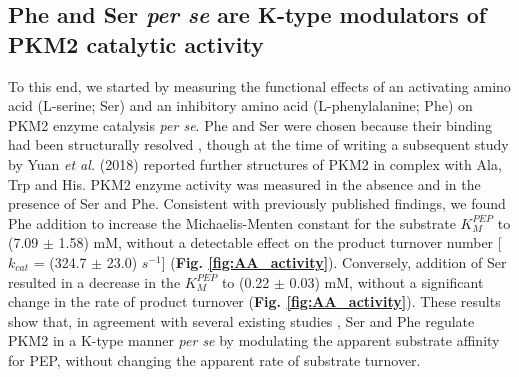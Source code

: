 \subsection{Phe and Ser \textit{per se} are K-type modulators of PKM2 catalytic activity}
\label{subsec:phe_ser_fbp_activity}
To this end, we started by measuring the functional effects of an activating amino acid (L-serine; Ser) and an inhibitory amino acid (L-phenylalanine; Phe) on PKM2 enzyme catalysis \textit{per se}. Phe and Ser were chosen because their binding had been structurally resolved \cite{Chaneton:2012aa,Morgan:2013aa}, though at the time of writing a subsequent study by Yuan \textit{et al.} (2018) \cite{Yuan:2018aa} reported further structures of PKM2 in complex with Ala, Trp and His. PKM2 enzyme activity was measured in the absence and in the presence of Ser and Phe. Consistent with previously published findings, we found Phe addition to increase the Michaelis-Menten constant for the substrate $K_{M}^{PEP}$ to (7.09 $\pm$ 1.58) mM, without a detectable effect on the product turnover number [$k_{cat}$ = (324.7 $\pm$ 23.0) $s^{-1}$] (\textbf{Fig. \ref{fig:AA_activity}}). Conversely, addition of Ser resulted in a decrease in the $K_{M}^{PEP}$ to (0.22 $\pm$ 0.03) mM, without a significant change in the rate of product turnover (\textbf{Fig. \ref{fig:AA_activity}}). These results show that, in agreement with several existing studies \cite{Ashizawa:1990aa,Ikeda:1998aa,Sparmann:1973aa,Chaneton:2012aa}, Ser and Phe regulate PKM2 in a K-type manner \textit{per se} by modulating the apparent substrate affinity for PEP, without changing the apparent rate of substrate turnover.
%
%
%

